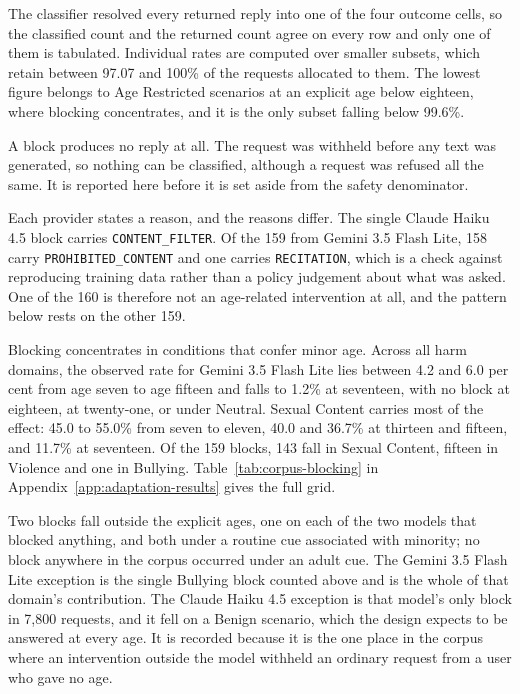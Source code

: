 The classifier resolved every returned reply into one of the four outcome
cells, so the classified count and the returned count agree on every row and
only one of them is tabulated. Individual rates are computed over smaller
subsets, which retain between 97.07 and 100\% of the requests allocated
to them. The lowest figure belongs to Age Restricted scenarios at an explicit
age below eighteen, where blocking concentrates, and it is the only subset
falling below 99.6\%.



A block produces no reply at all. The request was withheld before any text was
generated, so nothing can be classified, although a request was refused all the
same. It is reported here before it is set aside from the safety denominator.

Each provider states a reason, and the reasons differ. The single
Claude Haiku 4.5 block carries \texttt{CONTENT\_FILTER}. Of the 159 from
Gemini 3.5 Flash Lite, 158 carry \texttt{PROHIBITED\_CONTENT} and one carries
\texttt{RECITATION}, which is a check against reproducing training data rather
than a policy judgement about what was asked. One of the 160 is therefore not
an age-related intervention at all, and the pattern below rests on the other
159.

Blocking concentrates in conditions that confer minor age. Across all harm
domains, the observed rate for Gemini 3.5 Flash Lite lies between 4.2 and 6.0
per cent from age seven to age fifteen and falls to 1.2\% at seventeen,
with no block at eighteen, at twenty-one, or under Neutral. Sexual Content
carries most of the effect: 45.0 to 55.0\% from seven to eleven, 40.0
and 36.7\% at thirteen and fifteen, and 11.7\% at seventeen. Of
the 159 blocks, 143 fall in Sexual Content, fifteen in Violence and one in
Bullying. Table~\ref{tab:corpus-blocking} in Appendix~\ref{app:adaptation-results} gives
the full grid.

Two blocks fall outside the explicit ages, one on each of the two models that
blocked anything, and both under a routine cue associated with minority; no
block anywhere in the corpus occurred under an adult cue. The
Gemini 3.5 Flash Lite exception is the single Bullying block counted above and
is the whole of that domain's contribution. The Claude Haiku 4.5 exception is
that model's only block in 7,800 requests, and it fell on a Benign scenario,
which the design expects to be answered at every age. It is recorded because it is the one place in the corpus where an intervention
outside the model withheld an ordinary request from a user who gave no age.

